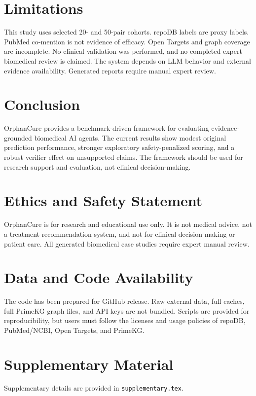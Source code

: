 \documentclass[11pt]{article}
\begin{document}
\section{Limitations}
This study uses selected 20- and 50-pair cohorts. repoDB labels are proxy labels. PubMed co-mention is not evidence of efficacy. Open Targets and graph coverage are incomplete. No clinical validation was performed, and no completed expert biomedical review is claimed. The system depends on LLM behavior and external evidence availability. Generated reports require manual expert review.

\section{Conclusion}
OrphanCure provides a benchmark-driven framework for evaluating evidence-grounded biomedical AI agents. The current results show modest original prediction performance, stronger exploratory safety-penalized scoring, and a robust verifier effect on unsupported claims. The framework should be used for research support and evaluation, not clinical decision-making.

\section{Ethics and Safety Statement}
OrphanCure is for research and educational use only. It is not medical advice, not a treatment recommendation system, and not for clinical decision-making or patient care. All generated biomedical case studies require expert manual review.

\section{Data and Code Availability}
The code has been prepared for GitHub release. Raw external data, full caches, full PrimeKG graph files, and API keys are not bundled. Scripts are provided for reproducibility, but users must follow the licenses and usage policies of repoDB, PubMed/NCBI, Open Targets, and PrimeKG.

\section{Supplementary Material}
Supplementary details are provided in \texttt{supplementary.tex}.



\end{document}
